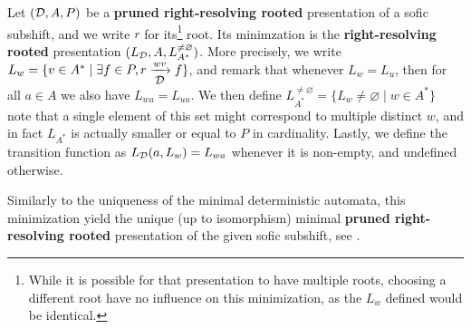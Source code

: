 \begin{definition}[Minimization]	
	Let $({\mathcal{D}},A,P)$ be a \textbf{pruned right-resolving rooted} presentation of a sofic subshift, and we write $r$ for its\footnote{While it is possible for that presentation to have multiple roots, choosing a different root have no influence on this minimization, as the $L_w$ defined would be identical.} root. Its minimzation is the \textbf{right-resolving rooted} presentation $(L_{\mathcal{D}},A,L^{\neq \varnothing}_{A^*})$.
	More precisely, we write $L_w = \{ v \in A^* \mid \exists f \in P, r \xrightarrow[\text{\small ${\mathcal{D}}$}]{wv} f\}$, and remark that whenever $L_w = L_u$, then for all $a \in A$ we also have $L_{wa} = L_{ua}$. We then define $L^{\neq \varnothing}_{A^*} = \{ L_w \neq \varnothing \mid w \in A^*\}$ note that a single element of this set might correspond to multiple distinct $w$, and in fact $L_{A^*}$ is actually smaller or equal to $P$ in cardinality. Lastly, we define the transition function as $L_{\mathcal{D}}(a,L_w) =  L_{wa}$ whenever it is non-empty, and undefined otherwise.
\end{definition}

Similarly to the uniqueness of the minimal deterministic automata, this minimization yield the unique (up to isomorphism) minimal \textbf{pruned right-resolving rooted} presentation of the given sofic subshift, see .

